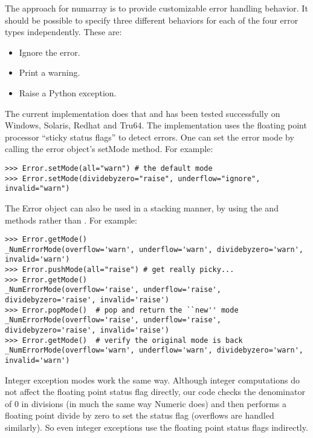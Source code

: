 The approach for numarray is to provide customizable error handling behavior.
It should be possible to specify three different behaviors for each of the four
error types independently. These are:
\begin{itemize}
\item Ignore the error.
\item Print a warning.
\item Raise a Python exception.
\end{itemize}
The current implementation does that and has been tested successfully on
Windows, Solaris, Redhat and Tru64.  The implementation uses the floating point
processor ``sticky status flags'' to detect errors. One can set the error mode
by calling the error object's setMode method. For example:
\begin{verbatim}
>>> Error.setMode(all="warn") # the default mode
>>> Error.setMode(dividebyzero="raise", underflow="ignore", invalid="warn")
\end{verbatim}

The Error object can also be used in a stacking manner, by using the 
and  methods rather than .  For example:
\begin{verbatim}
>>> Error.getMode()
_NumErrorMode(overflow='warn', underflow='warn', dividebyzero='warn', invalid='warn')
>>> Error.pushMode(all="raise") # get really picky...
>>> Error.getMode()
_NumErrorMode(overflow='raise', underflow='raise', dividebyzero='raise', invalid='raise')
>>> Error.popMode()  # pop and return the ``new'' mode
_NumErrorMode(overflow='raise', underflow='raise', dividebyzero='raise', invalid='raise')
>>> Error.getMode()  # verify the original mode is back
_NumErrorMode(overflow='warn', underflow='warn', dividebyzero='warn', invalid='warn')
\end{verbatim}
Integer exception modes work the same way. Although integer computations do not
affect the floating point status flag directly, our code checks the denominator
of 0 in divisions (in much the same way Numeric does) and then performs a
floating point divide by zero to set the status flag (overflows are handled
similarly). So even integer exceptions use the floating point status flags
indirectly.

\newpage
